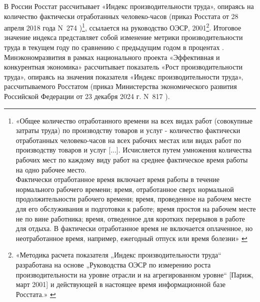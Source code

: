 \documentclass{article}
\begin{document}
В России Росстат рассчитывает «Индекс производительности труда», опираясь на количество фактически отработанных человеко-часов (приказ Росстата от 28 апреля 2018 года N~274 \cite{rosstat_prikaz274_28042018_LabourProductivityIndex})\footnote{«Общее количество отработанного времени на всех видах работ (совокупные затраты труда) по производству товаров и услуг - количество фактически отработанных человеко-часов на всех рабочих местах или видах работ по производству товаров и услуг [...]. Исчисляется путем умножения количества рабочих мест по каждому виду работ на среднее фактическое время работы на одно рабочее место.\\Фактически отработанное время включает время работы в течение нормального рабочего времени; время, отработанное сверх нормальной продолжительности рабочего времени; время, проведенное на рабочем месте для его обслуживания и подготовки к работе; время простоя на рабочем месте не по вине работника; время, отведенное для коротких перерывов в работе для отдыха. В фактически отработанное время не включается оплаченное, но неотработанное время, например, ежегодный отпуск или время болезни» \cite{rosstat_prikaz274_28042018_LabourProductivityIndex}}, ссылается на руководство ОЭСР, 2001\footnote{«Методика расчета показателя „Индекс производительности труда“ разработана на основе „Руководства ОЭСР по измерению роста производительности на уровне отрасли и на агрегированном уровне“ [Париж, март 2001] и действующей в настоящее время информационной базе Росстата.» \cite{rosstat_prikaz274_28042018_LabourProductivityIndex, oecdLabourProductivityManual2001}}. Итоговое значение индекса представляет собой изменение метрики производительности труда в текущем году по сравнению с предыдущим годом в процентах \cite{rosstatLabourProductivityIndexData2025}. Минэкономразвития в рамках национального проекта «Эффективная и конкурентная экономика» рассчитывает показатель «Рост производительности труда», опираясь на значения показателя «Индекс производительности труда», рассчитываемого Росстатом (приказ Министерства экономического развития Российской Федерации от 23 декабря 2024 г. N~817 \cite{mineco_prikaz817_23122024_LabourProductivityGrowth}).
\end{document}
